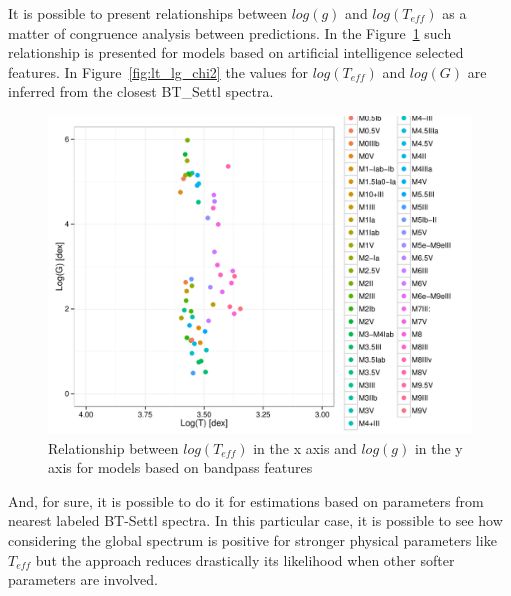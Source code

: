    




It is possible to present relationships between $log(g)$ and $log(T_{eff})$
as a matter of congruence analysis between predictions. In the Figure~\ref{fig:lt_lg_ga}
such relationship is presented for models based on artificial intelligence selected features.
In Figure~\ref{fig:lt_lg_chi2} the values for $log(T_{eff})$ and $log(G)$ are 
inferred from the closest BT\_Settl spectra.

\begin{figure}
 \begin{center}
 \includegraphics[width=12cm]{figs/LT_LG_ga.pdf}
 \caption{Relationship between $log(T_{eff}) $ in the x axis 
 and $log(g)$ in the y axis for models based on bandpass features }
 \label{fig:lt_lg_ga}
 \end{center}
\end{figure}

And, for sure, it is possible to do it for estimations based on 
parameters from nearest labeled BT-Settl spectra.
In this particular case, it is possible to see how 
considering the global spectrum is positive for stronger 
physical parameters like $T_{eff}$ but the approach
reduces drastically its likelihood when other softer 
parameters are involved.

